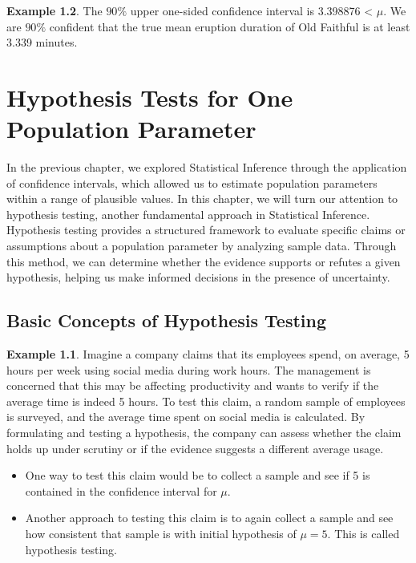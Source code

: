 \documentclass[
  11pt,
  oneside]{book}
\providecommand{\tightlist}{%
  \setlength{\itemsep}{0pt}\setlength{\parskip}{0pt}}
\theoremstyle{definition}
\theoremstyle{definition}
\newtheorem{example}{Example}[chapter]
\theoremstyle{definition}
\theoremstyle{definition}
\theoremstyle{remark}
\begin{document}
\begin{example}
The \(90\%\) upper one-sided confidence interval is 3.398876 \textless{} \(\mu\). We are \(90\%\) confident that the true mean eruption duration of Old Faithful is at least 3.339 minutes.

\chapter{Hypothesis Tests for One Population Parameter}\label{hypothesis-tests-for-one-population-parameter}

In the previous chapter, we explored Statistical Inference through the application of confidence intervals, which allowed us to estimate population parameters within a range of plausible values. In this chapter, we will turn our attention to hypothesis testing, another fundamental approach in Statistical Inference. Hypothesis testing provides a structured framework to evaluate specific claims or assumptions about a population parameter by analyzing sample data. Through this method, we can determine whether the evidence supports or refutes a given hypothesis, helping us make informed decisions in the presence of uncertainty.

\section{Basic Concepts of Hypothesis Testing}\label{basic-concepts-of-hypothesis-testing}

\begin{example}
Imagine a company claims that its employees spend, on average, 5 hours per week using social media during work hours. The management is concerned that this may be affecting productivity and wants to verify if the average time is indeed 5 hours. To test this claim, a random sample of employees is surveyed, and the average time spent on social media is calculated. By formulating and testing a hypothesis, the company can assess whether the claim holds up under scrutiny or if the evidence suggests a different average usage.
\end{example}

\begin{itemize}
\tightlist
\item
  One way to test this claim would be to collect a sample and see if 5 is contained in the confidence interval for \(\mu\).
\item
  Another approach to testing this claim is to again collect a sample and see how consistent that sample is with initial hypothesis of \(\mu=5\). This is called hypothesis testing.
\end{itemize}


\end{example}
\end{document}
